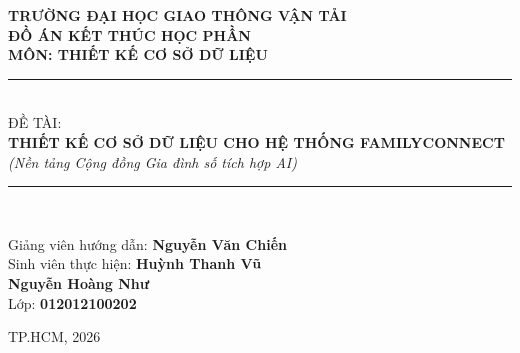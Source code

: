 {\Large\bfseries TRƯỜNG ĐẠI HỌC GIAO THÔNG VẬN TẢI}\\[0.3cm]
{\large\bfseries ĐỒ ÁN KẾT THÚC HỌC PHẦN}\\[0.2cm]
{\large\bfseries MÔN: THIẾT KẾ CƠ SỞ DỮ LIỆU}\\[1.5cm]

\rule{0.7\textwidth}{0.4pt}\\[0.5cm]
ĐỀ TÀI:\\[0.3cm]
{\LARGE\bfseries THIẾT KẾ CƠ SỞ DỮ LIỆU CHO HỆ THỐNG FAMILYCONNECT}\\[0.3cm]
\emph{(Nền tảng Cộng đồng Gia đình số tích hợp AI)}\\[0.5cm]
\rule{0.7\textwidth}{0.4pt}\\[2cm]

\begin{flushleft}
\hspace{4cm}\begin{minipage}{10cm}
Giảng viên hướng dẫn: \textbf{Nguyễn Văn Chiến}\\[0.3cm]
Sinh viên thực hiện: \textbf{Huỳnh Thanh Vũ}\\[0.3cm]
\phantom{Sinh viên thực hiện: }\textbf{Nguyễn Hoàng Như}\\[0.3cm]
Lớp: \textbf{012012100202}
\end{minipage}
\end{flushleft}

\vfill
{\large TP.HCM, 2026}
